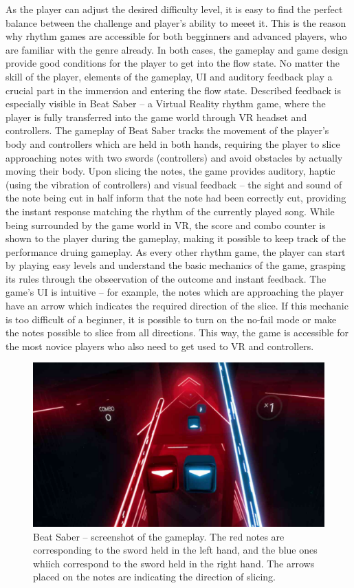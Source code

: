 As the player can adjust the desired difficulty level, it is easy to find the perfect balance between the challenge and player's ability to meeet it. This is the reason why rhythm games are accessible for both begginners and advanced players, who are familiar with the genre already. In both cases, the gameplay and game design provide good conditions for the player to get into the flow state. No matter the skill of the player, elements of the gameplay, UI and auditory feedback play a crucial part in the immersion and entering the flow state. Described feedback is especially visible in Beat Saber -- a Virtual Reality rhythm game, where the player is fully transferred into the game world through VR headset and controllers. The gameplay of Beat Saber tracks the movement of the player's body and controllers which are held in both hands, requiring the player to slice approaching notes with two swords (controllers) and avoid obstacles by actually moving their body. Upon slicing the notes, the game provides auditory, haptic (using the vibration of controllers) and visual feedback -- the sight and sound of the note being cut in half inform that the note had been correctly cut, providing the instant response matching the rhythm of the currently played song. While being surrounded by the game world in VR, the score and combo counter is shown to the player during the gameplay, making it possible to keep track of the performance druing gameplay. As every other rhythm game, the player can start by playing easy levels and understand the basic mechanics of the game, grasping its rules through the obseervation of the outcome and instant feedback. The game's UI is intuitive -- for example, the notes which are approaching the player have an arrow which indicates the required direction of the slice. If this mechanic is too difficult of a beginner, it is possible to turn on the no-fail mode or make the notes possible to slice from all directions. This way, the game is accessible for the most novice players who also need to get used to VR and controllers.

\begin{figure}[h]
    \centering\includegraphics[scale=0.2]{obrazki/beatsaber.jpg}
    \caption{Beat Saber -- screenshot of the gameplay. The red notes are corresponding to the sword held in the left hand, and the blue ones whiich correspond to the sword held in the right hand. The arrows placed on the notes are indicating the direction of slicing. \cite{beatsaber}}
    \label{fig:beatsaber}
\end{figure}

